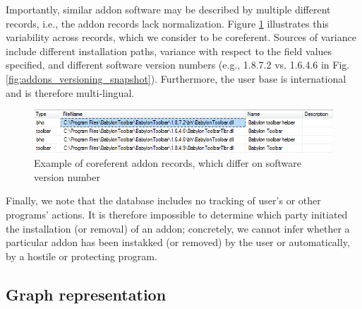 \documentclass[ijoc,nonblindrev]{informs3} %
\numberwithin{equation}{subsection}
\begin{document}
Importantly, similar addon software may be described by multiple different records, i.e., the addon records lack normalization. Figure \ref{fig:addons_versioning_snapshot} illustrates this variability across records, which we consider to be coreferent. Sources of variance include different installation paths, variance with respect to the field values specified, and different software version numbers (e.g., 1.8.7.2 vs. 1.6.4.6 in Fig. \autoref{fig:addons_versioning_snapshot}). Furthermore, the user base is international and is therefore multi-lingual. 

\begin{figure}[t]
\centering
\begin{small}
\includegraphics[scale=.8,angle=0]{figures/addons_versioning_snapshot.png}
\end{small}
\caption{Example of coreferent addon records, which differ on software version number}
\label{fig:addons_versioning_snapshot}
\end{figure}

Finally, we note that the database includes no tracking of user's or other programs' actions. It is therefore impossible to determine which party initiated the installation (or removal) of an addon; concretely, we cannot infer whether a particular addon has been instakked (or removed) by the user or automatically, by a hostile or protecting program. 

\subsection{Graph representation}
\label{tab:graph_representation}
\end{document}
